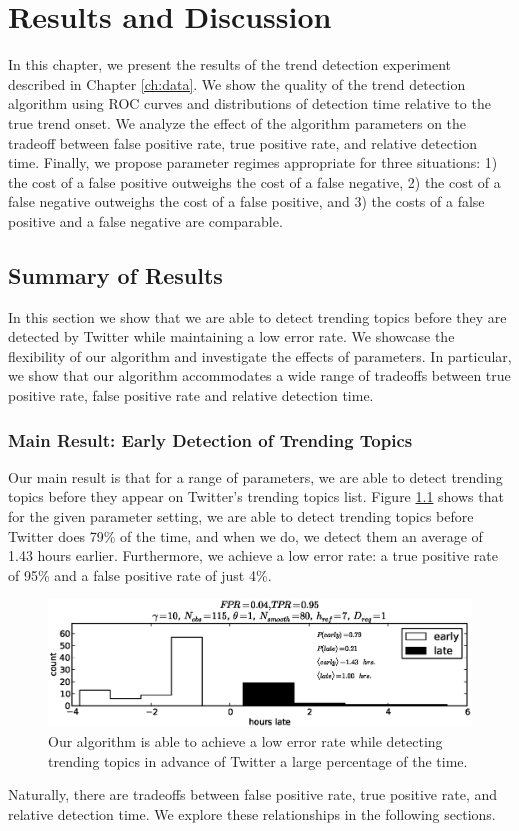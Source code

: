 \chapter{Results and Discussion}
\label{ch:results}

In this chapter, we present the results of the trend detection experiment
described in Chapter \ref{ch:data}. We show the quality of the trend detection
algorithm using ROC curves and distributions of detection time relative to the
true trend onset. We analyze the effect of the algorithm parameters on the
tradeoff between false positive rate, true positive rate, and relative detection
time. Finally, we propose parameter regimes appropriate for three situations: 1)
the cost of a false positive outweighs the cost of a false negative, 2) the cost
of a false negative outweighs the cost of a false positive, and 3) the costs of
a false positive and a false negative are comparable.

\section{Summary of Results}

In this section we show that we are able to detect trending topics before they
are detected by Twitter while maintaining a low error rate. We showcase the
flexibility of our algorithm and investigate the effects of parameters. In
particular, we show that our algorithm accommodates a wide range of tradeoffs
between true positive rate, false positive rate and relative detection time.

\subsection{Main Result: Early Detection of Trending Topics}
Our main result is that for a range of parameters, we are able to detect
trending topics before they appear on Twitter's trending topics list. Figure
\ref{fig:early} shows that for the given parameter setting, we are able to
detect trending topics before Twitter does 79\% of the time, and when we do, we
detect them an average of 1.43 hours earlier. Furthermore, we achieve a low
error rate: a true positive rate of 95\% and a false positive rate of just 4\%.
\begin{figure}[!h]
\begin{center}
\includegraphics[width=6in]{../fig/final/twitter_killer/ex2}
\end{center}
\caption{\label{fig:early} Our algorithm is able to achieve a low error rate
  while detecting trending topics in advance of Twitter a large percentage of
  the time.}
\end{figure}
Naturally, there are tradeoffs between false positive rate, true positive rate,
and relative detection time. We explore these relationships in the following
sections.

